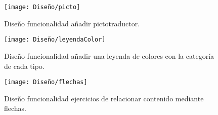 \begin{figure}[ht!]
  \centering
  \texttt{[image: Diseño/picto]}
  \caption{Diseño funcionalidad añadir pictotraductor.}
  \label{picto}
\end{figure}
\begin{figure}[ht!]
  \centering
  \texttt{[image: Diseño/leyendaColor]}
  \caption{Diseño funcionalidad añadir una leyenda de colores con la categoría de cada tipo.}
  \label{leyenda}
\end{figure}
\begin{figure}[ht!]
  \centering
  \texttt{[image: Diseño/flechas]}
  \caption{Diseño funcionalidad ejercicios de relacionar contenido mediante flechas.}
  \label{flecha}
\end{figure}